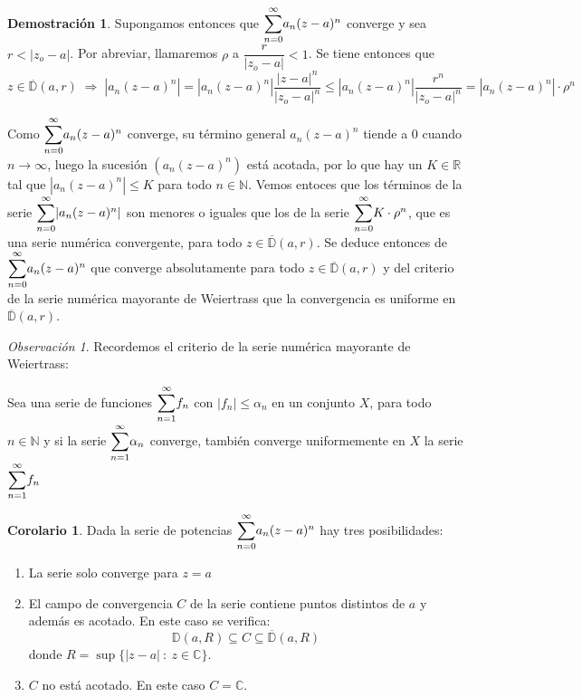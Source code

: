 \documentclass[12pt,twoside]{report}
\theoremstyle{azul}
\theoremstyle{azul2}
\theoremstyle{plain}
\theoremstyle{definition}
\newtheorem*{dem}{Demostración}
\newtheorem*{cor}{Corolario}
\theoremstyle{remark}
\newtheorem*{obs}{Observación}
\begin{document}
\begin{dem}

Supongamos entonces que $\mathlarger{\sum_{n=0}^{\infty}} a_n (z-a)^n$ converge y sea $r<|z_o-a|$. Por abreviar, llamaremos $\rho$ a $\dfrac{r}{|z_o - a|} < 1$. Se tiene entonces que 
$$z \in \overline{\mathbb{D}}(a,r) \; \Rightarrow \; |a_n(z-a)^n| = |a_n(z-a)^n| \dfrac{|z-a|^n}{|z_o-a|^n} \leq |a_n(z-a)^n| \dfrac{r^n}{|z_o-a|^n} = |a_n(z-a)^n| \cdot \rho^n $$ 

Como $\mathlarger{\sum_{n=0}^{\infty}} a_n (z-a)^n$ converge, su término general $a_n (z-a)^n$ tiende a 0 cuando $n \to \infty$, luego la sucesión $(a_n (z-a)^n)$ está acotada, por lo que hay un $K \in \mathbb{R}$ tal que $|a_n (z-a)^n| \leq K$ para todo $n \in \mathbb{N}$. Vemos entoces que los términos de la serie $\mathlarger{\sum_{n=0}^{\infty}} | a_n (z-a)^n |$ son menores o iguales que los de la serie $\mathlarger{\sum_{n=0}^{\infty}} K \cdot \rho^n$, que es una serie numérica convergente, para todo $z \in \overline{\mathbb{D}}(a,r)$. Se deduce entonces de $\mathlarger{\sum_{n=0}^{\infty}} a_n (z-a)^n$ que converge absolutamente para todo $z \in \overline{\mathbb{D}}(a,r)$ y del criterio de la serie numérica mayorante de Weiertrass que la convergencia es uniforme en $\overline{\mathbb{D}}(a,r)$.
\begin{obs}
    Recordemos el criterio de la serie numérica mayorante de Weiertrass:
    
    Sea una serie de funciones $\mathlarger{\sum_{n=1}^{\infty}} f_n$ con $|f_n|\leq \alpha_n$ en un conjunto $X$, para todo $n \in \mathbb{N}$ y si la serie $\mathlarger{\sum_{n=1}^{\infty}} \alpha_n$ converge, también converge uniformemente en $X$ la serie $\mathlarger{\sum_{n=1}^{\infty}} f_n$
\end{obs}
    

\end{dem}
\begin{cor}
Dada la serie de potencias $\mathlarger{\sum_{n=0}^{\infty}} a_n (z-a)^n$ hay tres posibilidades:
\begin{enumerate}
    \item La serie solo converge para $z = a$
    \item El campo de convergencia $C$ de la serie contiene puntos distintos de $a$ y además es acotado. En este caso se verifica:
    $$\mathbb{D}(a,R) \subseteq C \subseteq \overline{\mathbb{D}}(a,R)$$
    donde $R = \sup\{|z-a| \: : \: z \in \mathbb{C}\}$.
    \item $C$ no está acotado. En este caso $C = \mathbb{C}$. 
\end{enumerate}
\end{cor}
\end{document}
